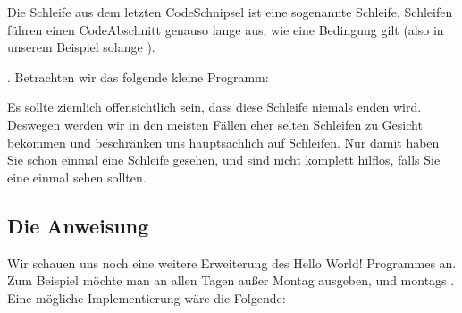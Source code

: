\documentclass[letterpaper,10pt,english]{jupyterBook}
\begin{document}
\sphinxAtStartPar
Die Schleife aus dem letzten Code\sphinxhyphen{}Schnipsel ist eine sogenannte \sphinxhyphen{}Schleife. \sphinxhyphen{}Schleifen führen einen Code\sphinxhyphen{}Abschnitt genauso lange aus, wie eine Bedingung gilt (also in unserem Beispiel solange ).

\sphinxAtStartPar
{}. Betrachten wir das folgende kleine Programm:

\begin{sphinxVerbatim}[commandchars=\\\{\}]
 
       
          
\end{sphinxVerbatim}

\sphinxAtStartPar
Es sollte ziemlich offensichtlich sein, dass diese Schleife niemals enden wird. Deswegen werden wir in den meisten Fällen eher selten \sphinxhyphen{}Schleifen zu Gesicht bekommen und beschränken uns hauptsächlich auf \sphinxhyphen{}Schleifen. Nur damit haben Sie schon einmal eine \sphinxhyphen{}Schleife gesehen, und sind nicht komplett hilflos, falls Sie eine einmal sehen sollten.


\subsection{Die  \sphinxhyphen{} Anweisung}
\label{\detokenize{Notebooks/Hello World!:die-if-else-anweisung}}
\sphinxAtStartPar
Wir schauen uns noch eine weitere Erweiterung des Hello World! \sphinxhyphen{} Programmes an. Zum Beispiel möchte man an allen Tagen außer Montag  ausgeben, und montags . Eine mögliche Implementierung wäre die Folgende:
\end{document}
